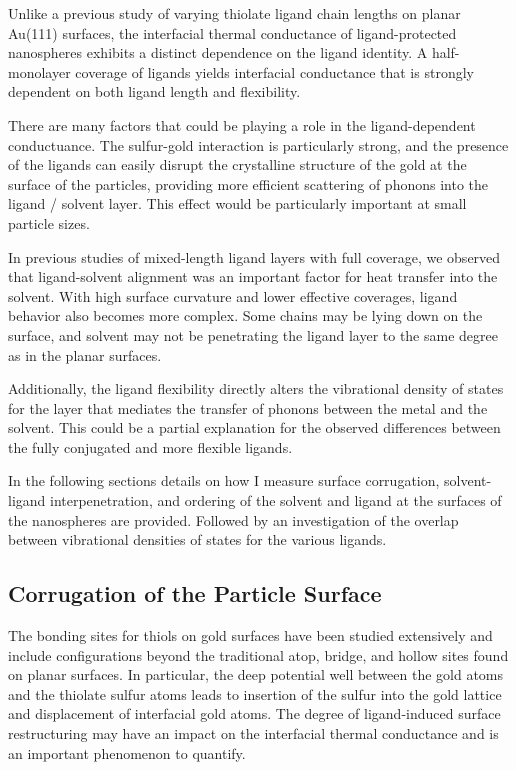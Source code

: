 Unlike a previous study of varying thiolate ligand chain lengths on
planar Au(111) surfaces, the interfacial thermal conductance of
ligand-protected nanospheres exhibits a distinct dependence on the
ligand identity.\cite{} A half-monolayer coverage of ligands yields
interfacial conductance that is strongly dependent on both ligand
length and flexibility.

There are many factors that could be playing a role in the
ligand-dependent conductuance.  The sulfur-gold interaction is
particularly strong, and the presence of the ligands can easily
disrupt the crystalline structure of the gold at the surface of the
particles, providing more efficient scattering of phonons into the
ligand / solvent layer. This effect would be particularly important at
small particle sizes.

In previous studies of mixed-length ligand layers with full coverage,
we observed that ligand-solvent alignment was an important factor for
heat transfer into the solvent.  With high surface curvature and lower
effective coverages, ligand behavior also becomes more complex. Some
chains may be lying down on the surface, and solvent may not be
penetrating the ligand layer to the same degree as in the planar
surfaces.  

Additionally, the ligand flexibility directly alters the vibrational
density of states for the layer that mediates the transfer of phonons
between the metal and the solvent. This could be a partial explanation
for the observed differences between the fully conjugated and more
flexible ligands.

In the following sections details on how I
measure surface corrugation, solvent-ligand interpenetration, and
ordering of the solvent and ligand at the surfaces of the
nanospheres are provided. Followed by an investigation of 
the overlap between vibrational densities of states for the various ligands.

\subsection{Corrugation of the Particle Surface}

The bonding sites for thiols on gold surfaces have been studied
extensively and include configurations beyond the traditional atop,
bridge, and hollow sites found on planar surfaces. In particular, the
deep potential well between the gold atoms and the thiolate sulfur
atoms leads to insertion of the sulfur into the gold lattice and
displacement of interfacial gold atoms. The degree of ligand-induced
surface restructuring may have an impact on the interfacial thermal
conductance and is an important phenomenon to quantify.

